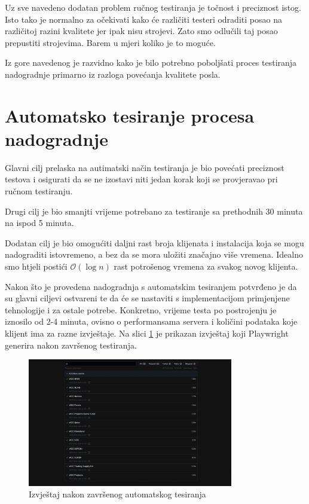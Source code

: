 Uz sve navedeno dodatan problem ručnog testiranja je točnost i preciznost istog.
Isto tako je normalno za očekivati kako će različiti testeri odraditi posao na različitoj razini kvalitete jer ipak nisu strojevi.
Zato smo odlučili taj posao prepustiti strojevima.
Barem u mjeri koliko je to moguće.

Iz gore navedenog je razvidno kako je bilo potrebno poboljšati proces testiranja nadogradnje primarno iz razloga povećanja kvalitete posla.

\section{Automatsko tesiranje procesa nadogradnje}

Glavni cilj prelaska na autimatski način testiranja je bio povećati preciznost testova i osigurati da se ne izostavi niti jedan korak koji se provjeravao pri ručnom testiranju.

Drugi cilj je bio smanjti vrijeme potrebano za testiranje sa prethodnih 30 minuta na ispod 5 minuta.

Dodatan cilj je bio omogućiti daljni rast broja klijenata i instalacija koja se mogu nadograditi istovremeno, a bez da se mora uložiti značajno više vremena.
Idealno smo htjeli postići $\mathcal{O}(\log n)$ rast potrošenog vremena za svakog novog klijenta.

Nakon što je provedena nadogradnja s automatskim tesiranjem potvrđeno je da su glavni ciljevi ostvareni te da će se nastaviti s implementacijom primjenjene tehnologije i za ostale potrebe.
Konkretno, vrijeme testa po postrojenju je iznosilo od 2-4 minuta, ovisno o performansama servera i količini podataka koje klijent ima za razne izvještaje.
Na slici \ref{img:fullTestPass} je prikazan izvještaj koji Playwright generira nakon završenog testiranja.
\begin{figure}[!h]\begin{center}
    \includegraphics[width=0.8\textwidth]{"img/fullTestPass"}
    \caption{Izvještaj nakon završenog automatskog tesiranja}\label{img:fullTestPass}
\end{center}\end{figure}
 
